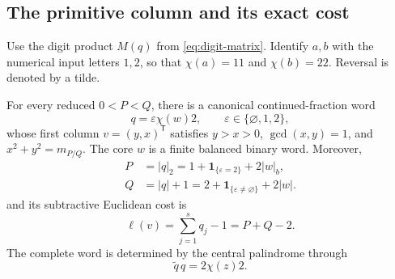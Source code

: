 \subsection{The primitive column and its exact cost}

Use the digit product $M(q)$ from \eqref{eq:digit-matrix}. Identify
$a,b$ with the numerical input letters $1,2$, so that $\chi(a)=11$ and
$\chi(b)=22$. Reversal is denoted by a tilde.

\begin{proposition}\label{prop:genuine-source-dictionary}
For every reduced $0<P<Q$, there is a canonical continued-fraction
word
\begin{equation}\label{eq:source-half}
 q=\varepsilon\chi(w)2,\qquad
 \varepsilon\in\{\varnothing,1,2\},
\end{equation}
whose first column $v=(y,x)^{\mathsf T}$ satisfies
$y>x>0$, $\gcd(x,y)=1$, and $x^2+y^2=m_{P/Q}$.
The core $w$ is a finite balanced binary word. Moreover,
\begin{equation}\label{eq:source-counts}
 \begin{aligned}
 P&=|q|_2=1+\mathbf1_{\{\varepsilon=2\}}+2|w|_b,\\
 Q&=|q|+1=2+\mathbf1_{\{\varepsilon\ne\varnothing\}}+2|w|.
 \end{aligned}
\end{equation}
and its subtractive Euclidean cost is
\begin{equation}\label{eq:source-cost}
 \ell(v)=\sum_{j=1}^s q_j-1=P+Q-2.
\end{equation}
The complete word is determined by the central palindrome through
\begin{equation}\label{eq:source-full-palindrome}
 \widetilde q\,q=2\chi(z)2.
\end{equation}
\end{proposition}

